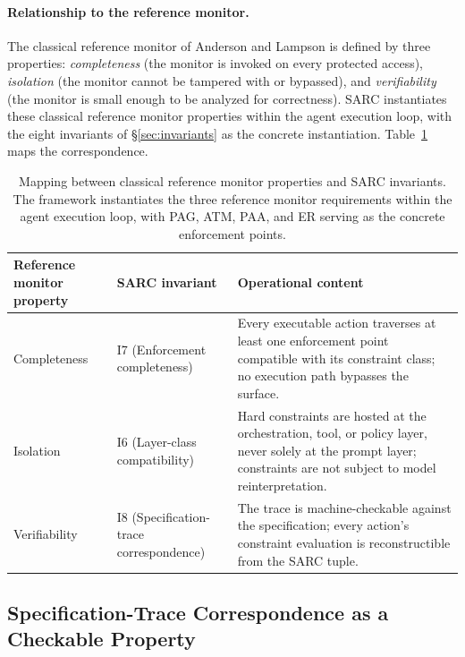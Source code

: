 \documentclass[11pt,a4paper]{article}
\theoremstyle{remark}
\begin{document}
\paragraph{Relationship to the reference monitor.} The classical reference monitor of Anderson \cite{anderson1972security} and Lampson \cite{lampson1971protection} is defined by three properties: \emph{completeness} (the monitor is invoked on every protected access), \emph{isolation} (the monitor cannot be tampered with or bypassed), and \emph{verifiability} (the monitor is small enough to be analyzed for correctness). SARC instantiates these classical reference monitor properties within the agent execution loop, with the eight invariants of \S\ref{sec:invariants} as the concrete instantiation. Table~\ref{tab:refmon} maps the correspondence.

\begin{table}[!htbp]
\centering\small
\begin{tabular}{@{}p{3.5cm}p{4cm}p{6.5cm}@{}}
\toprule
\textbf{Reference monitor property} & \textbf{SARC invariant} & \textbf{Operational content} \\
\midrule
Completeness & I7 (Enforcement completeness) & Every executable action traverses at least one enforcement point compatible with its constraint class; no execution path bypasses the surface. \\
Isolation & I6 (Layer-class compatibility) & Hard constraints are hosted at the orchestration, tool, or policy layer, never solely at the prompt layer; constraints are not subject to model reinterpretation. \\
Verifiability & I8 (Specification-trace correspondence) & The trace is machine-checkable against the specification; every action's constraint evaluation is reconstructible from the SARC tuple. \\
\bottomrule
\end{tabular}
\caption{Mapping between classical reference monitor properties and SARC invariants. The framework instantiates the three reference monitor requirements within the agent execution loop, with PAG, ATM, PAA, and ER serving as the concrete enforcement points.}
\label{tab:refmon}
\end{table}

\subsection{Specification-Trace Correspondence as a Checkable Property}\label{sec:audit-checker}
\end{document}
